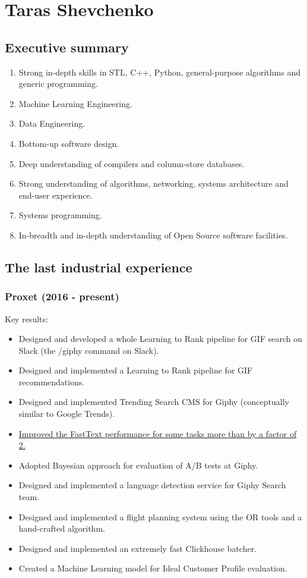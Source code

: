 \documentclass[a4paper,12pt,final]{extreport}
\begin{document}
\section{Taras Shevchenko}
\subsection{Executive summary}
\begin{enumerate}
  \item Strong in-depth skills in STL, C++, Python, general-purpose algorithms and generic programming.
  \item Machine Learning Engineering.
  \item Data Engineering.
  \item Bottom-up software design.
  \item Deep understanding of compilers and column-store databases.
  \item Strong understanding of algorithms, networking, systems architecture and end-user experience.
  \item Systems programming.
  \item In-breadth and in-depth understanding of Open Source software facilities.
\end{enumerate}

\subsection{The last industrial experience} \subsubsection{Proxet (2016 - present)}
Key results:
\begin{itemize}
  \item Designed and developed a whole Learning to Rank pipeline for GIF search on Slack (the /giphy command on Slack).
  \item Designed and implemented a Learning to Rank pipeline for GIF recommendations.
  \item Designed and implemented Trending Search CMS for Giphy (conceptually similar to Google Trends).
  \item \href{https://engineering.giphy.com/how-we-made-fasttext-faster/}{Improved the FastText performance for some tasks more than by a factor of 2.}
  \item Adopted Bayesian approach for evaluation of A/B tests at Giphy.
  \item Designed and implemented a language detection service for Giphy Search team.
  \item Designed and implemented a flight planning system using the OR tools and a hand-crafted algorithm.
  \item Designed and implemented an extremely fast Clickhouse batcher.
  \item Created a Machine Learning model for Ideal Customer Profile evaluation.
\end{itemize}
\end{document}
